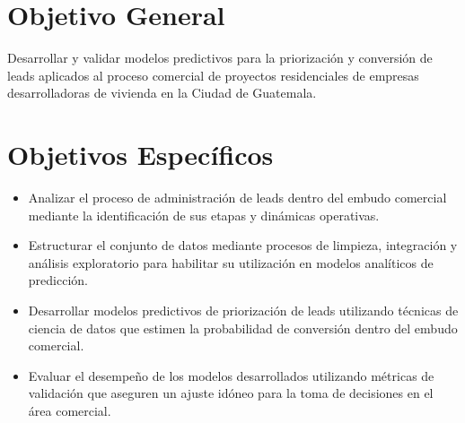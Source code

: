 \section{Objetivo General}

Desarrollar y validar modelos predictivos para la priorización y conversión de leads aplicados al proceso comercial de proyectos residenciales de empresas desarrolladoras de vivienda en la Ciudad de Guatemala.

\section{Objetivos Específicos}

\begin{itemize}
    \item Analizar el proceso de administración de leads dentro del embudo comercial mediante la identificación de sus etapas y dinámicas operativas.
    
    \item Estructurar el conjunto de datos mediante procesos de limpieza, integración y análisis exploratorio para habilitar su utilización en modelos analíticos de predicción.
    
    \item Desarrollar modelos predictivos de priorización de leads utilizando técnicas de ciencia de datos que estimen la probabilidad de conversión dentro del embudo comercial.
    
    \item Evaluar el desempeño de los modelos desarrollados utilizando métricas de validación que aseguren un ajuste idóneo para la toma de decisiones en el área comercial.
\end{itemize}